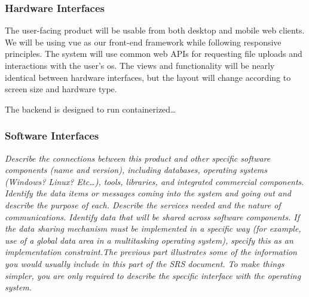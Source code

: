         \subsubsection{Hardware Interfaces}\label{sec:hardware-interfaces}
            The user-facing product will be usable from both desktop and mobile web clients. We will be using \gls{vue} as our front-end framework while following \gls{responsive} principles. The system will use common web APIs for requesting file uploads and interactions with the user's \gls{os}. The views and functionality will be nearly identical between hardware interfaces, but the layout will change according to screen size and hardware type.
            \par The backend is designed to run containerized\dots %
        \subsubsection{Software Interfaces}\label{sec:software-interfaces}
            \emph{Describe the connections between this product and other specific software components (name and version), including databases, operating systems (Windows? Linux? Etc\dots), tools, libraries, and integrated commercial components. Identify the data items or messages coming into the system and going out and describe the purpose of each. Describe the services needed and the nature of communications. Identify data that will be shared across software components. If the data sharing mechanism must be implemented in a specific way (for example, use of a global data area in a multitasking operating system), specify this as an implementation constraint.\gnl The previous part illustrates some of the information you would usually include in this part of the SRS document. To make things simpler, you are only required to describe the specific interface with the operating system.}
